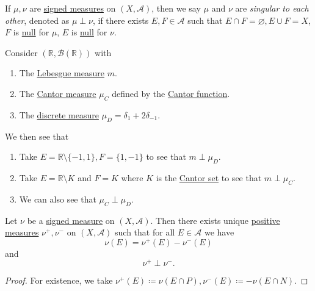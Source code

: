 \begin{definition}[Singular]\label{def:singular}
  If \(\mu,\nu\) are \hyperref[def:signed-measure]{signed measures} on \((X, \mathcal{A})\), then we say \(\mu\) and \(\nu \) are \emph{singular to each other}, denoted as
  \(\mu \perp \nu\), if there exists \(E,F \in \mathcal{A}\) such that \(E \cap F = \varnothing, E \cup F = X\), \(F\) is \hyperref[def:null-set-for-a-signed-measure]{null}
  for \(\mu\), \(E\) is \hyperref[def:null-set-for-a-signed-measure]{null} for \(\nu\).
\end{definition}

\begin{eg}
  Consider \((\mathbb{R}, \mathcal{B}(\mathbb{R}))\) with
  \begin{enumerate}
    \item The \hyperref[def:Lebesgue-measure]{Lebesgue measure} \(m\).
    \item The \hyperref[def:Cantor-measure]{Cantor measure} \(\mu_C\) defined by the \hyperref[sssec:Cantor-Function]{Cantor function}.
    \item The \hyperref[eg:discrete-measure]{discrete measure} \(\mu_D = \delta_1 + 2\delta_{-1}\).
  \end{enumerate}

  We then see that
  \begin{enumerate}
    \item Take \(E = \mathbb{R} \setminus \{-1,1\}, F = \{1,-1\}\) to see that \(m \perp \mu_D\).
    \item Take \(E = \mathbb{R} \setminus K\) and \(F = K\) where \(K\) is the \hyperref[eg:lec8:Cantor-set]{Cantor set} to see that \(m \perp \mu_C\).
    \item We can also see that \(\mu_C \perp \mu_D\).
  \end{enumerate}
\end{eg}

\begin{theorem}\label{thm:Jordan-decomposition-theorem}
  Let \(\nu\) be a \hyperref[def:signed-measure]{signed measure} on \((X, \mathcal{A})\). Then there exists unique \hyperref[def:measure]{positive measures} \(\nu^+,\nu^-\)
  on \((X, \mathcal{A})\) such that for all \(E \in \mathcal{A}\) we have
  \[
    \nu(E) = \nu^+(E) - \nu^-(E)
  \]
  and
  \[
    \nu^+ \perp \nu^-.
  \]
\end{theorem}
\begin{proof}
  For existence, we take \(\nu^+(E) \coloneqq \nu(E \cap P), \nu^-(E) \coloneqq -\nu(E \cap N)\). 
\end{proof}
